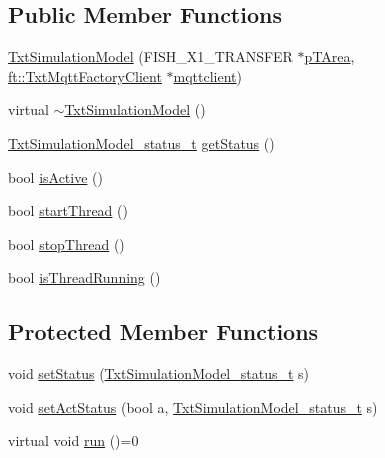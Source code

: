 \subsection*{Public Member Functions}
\begin{DoxyCompactItemize}
\item 
\hyperlink{classft_1_1_txt_simulation_model_aaafbd4f315c5de7ff9edaf223b9c6bf4}{Txt\+Simulation\+Model} (F\+I\+S\+H\+\_\+\+X1\+\_\+\+T\+R\+A\+N\+S\+F\+ER $\ast$\hyperlink{classft_1_1_txt_simulation_model_a9facd66a0dbecd676ae7b72c37a0b300}{p\+T\+Area}, \hyperlink{classft_1_1_txt_mqtt_factory_client}{ft\+::\+Txt\+Mqtt\+Factory\+Client} $\ast$\hyperlink{classft_1_1_txt_simulation_model_a6a92fdef8619b9b1636c7c464091ea3a}{mqttclient})
\item 
virtual \hyperlink{classft_1_1_txt_simulation_model_a9e9d996203e1b125f193b2d5e19b9b99}{$\sim$\+Txt\+Simulation\+Model} ()
\item 
\hyperlink{namespaceft_a869be7c916433e2a139e184b05816c1a}{Txt\+Simulation\+Model\+\_\+status\+\_\+t} \hyperlink{classft_1_1_txt_simulation_model_a0f195a9d4c9e3c4fd73ccf5b23d45b70}{get\+Status} ()
\item 
bool \hyperlink{classft_1_1_txt_simulation_model_a44a08a224c9f1a09c3071a86f6ccff34}{is\+Active} ()
\item 
bool \hyperlink{classft_1_1_txt_simulation_model_a5d02cbc34685f0ab97f46b25f0989674}{start\+Thread} ()
\item 
bool \hyperlink{classft_1_1_txt_simulation_model_a495d61475c26d80af1097de7f787f6ae}{stop\+Thread} ()
\item 
bool \hyperlink{classft_1_1_txt_simulation_model_ac4aec0b8f7e48ec43bf0a8df06c2ace2}{is\+Thread\+Running} ()
\end{DoxyCompactItemize}
\subsection*{Protected Member Functions}
\begin{DoxyCompactItemize}
\item 
void \hyperlink{classft_1_1_txt_simulation_model_a1e9227dca8ca282e5219c9a4b2c07124}{set\+Status} (\hyperlink{namespaceft_a869be7c916433e2a139e184b05816c1a}{Txt\+Simulation\+Model\+\_\+status\+\_\+t} s)
\item 
void \hyperlink{classft_1_1_txt_simulation_model_ab58ddba4515ddbaef697b69717673094}{set\+Act\+Status} (bool a, \hyperlink{namespaceft_a869be7c916433e2a139e184b05816c1a}{Txt\+Simulation\+Model\+\_\+status\+\_\+t} s)
\item 
virtual void \hyperlink{classft_1_1_txt_simulation_model_a91595c8fc91104e98d2ea13fe349b777}{run} ()=0
\end{DoxyCompactItemize}
